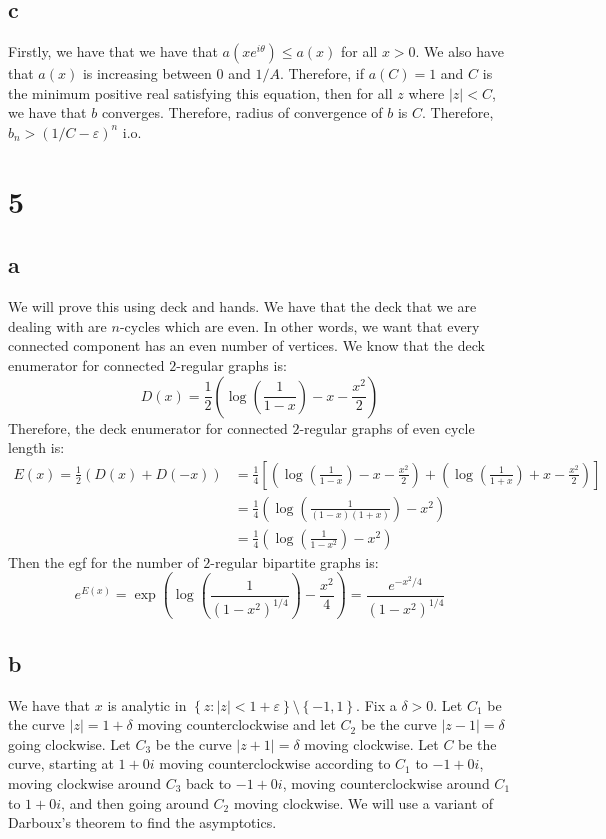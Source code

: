 \documentclass[]{article}
\begin{document}
\subsection{c}
Firstly, we have that we have that $a(x e^{i\theta}) \leq a(x)$ for all $x > 0$. We also have that $a(x)$ is increasing between $0$ and $1/A$. Therefore, if $a(C) = 1$ and $C$ is the minimum positive real satisfying this equation, then for all $z$ where $|z| < C$, we have that $b$ converges. Therefore, radius of convergence of $b$ is $C$. Therefore, $b_n > \left(1/C - \varepsilon \right)^n$ i.o. 

\section{5}

\subsection{a}
We will prove this using deck and hands.
We have that the deck that we are dealing with are $n$-cycles which are even. In other words, we want that every connected component has an even number of vertices. We know that the deck enumerator for connected $2$-regular graphs is:
\begin{equation}
	D(x) = \frac{1}{2}\left(\log\left(\frac{1}{1 - x}\right) - x - \frac{x^2}{2}\right)
\end{equation}
Therefore, the deck enumerator for connected $2$-regular graphs of even cycle length is:
\begin{align}
	E(x) = \frac{1}{2} \left(D(x) + D(-x)\right) &= \frac{1}{4} \left[ \left(\log\left(\frac{1}{1 - x}\right) - x - \frac{x^2}{2}\right) + \left(\log\left(\frac{1}{1 + x}\right) + x - \frac{x^2}{2}\right) \right]\\
	&=\frac{1}{4} \left(\log\left(\frac{1}{(1 - x)(1 + x)}\right) - x^2\right) \\
	&=\frac{1}{4} \left(\log\left(\frac{1}{1 - x^2}\right)- x^2\right) 
\end{align}
Then the egf for the number of $2$-regular bipartite graphs is:
\begin{equation}
	e^{E(x)} = \exp\left(\log\left(\frac{1}{(1 - x^2)^{1/4}}\right)- \frac{x^2}{4}\right)  = \frac{e^{-x^2/4}}{(1 - x^2)^{1/4}}
\end{equation}

\subsection{b}
We have that $x$ is analytic in $\left\{ z: |z| < 1 + \varepsilon \right\} \setminus \left\{ -1, 1 \right\}$. Fix a $\delta > 0$. Let $C_1$ be the curve $|z| = 1 + \delta$ moving counterclockwise  and let $C_2$ be the curve $|z - 1| = \delta$ going clockwise. Let $C_3$ be the curve $|z + 1| = \delta$ moving clockwise. Let $C$ be the curve, starting at $1 + 0i$ moving counterclockwise according to $C_1$ to $-1 + 0i$, moving clockwise around $C_3$ back to $-1 + 0 i$, moving counterclockwise around $C_1$ to $1 + 0i$, and then going around $C_2$ moving clockwise. We will use a variant of Darboux's theorem to find the asymptotics.
\end{document}
